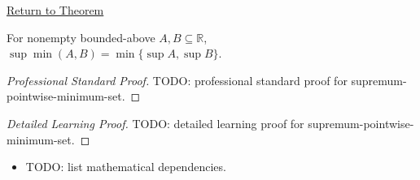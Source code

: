 \newpage
{}
\label{prf:supremum-pointwise-minimum-set}

\begin{remark*}[Return]
\hyperref[thm:supremum-pointwise-minimum-set]{Return to Theorem}
\end{remark*}

\begin{theorem*}
For nonempty bounded-above $A,B\subseteq\mathbb{R}$,
$\sup\min(A,B)=\min\{\sup A,\sup B\}$.
\end{theorem*}

\begin{proof}[Professional Standard Proof]
\LRAProofBodyStart
TODO: professional standard proof for supremum-pointwise-minimum-set.
\end{proof}

\begin{proof}[Detailed Learning Proof]
\LRAProofBodyStart
TODO: detailed learning proof for supremum-pointwise-minimum-set.
\end{proof}

\begin{remark*}
\end{remark*}

\begin{dependencies}
\begin{itemize}
  \item TODO: list mathematical dependencies.
\end{itemize}
\end{dependencies}

\clearpage
